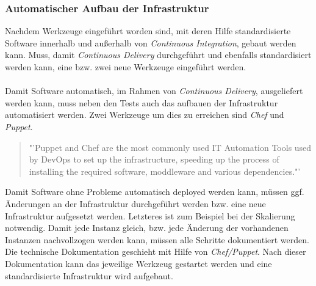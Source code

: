 \subsubsection*{Automatischer Aufbau der Infrastruktur}
Nachdem Werkzeuge eingeführt worden sind, mit deren Hilfe standardisierte Software innerhalb und außerhalb von \textit{Continuous Integration}, gebaut werden kann. Muss, damit \textit{Continuous Delivery} durchgeführt und ebenfalls standardisiert werden kann, eine bzw. zwei neue Werkzeuge eingeführt werden.
\\\\
Damit Software automatisch, im Rahmen von \textit{Continuous Delivery}, ausgeliefert werden kann, muss neben den Tests auch das aufbauen der Infrastruktur automatisiert werden. Zwei Werkzeuge um dies zu erreichen sind \textit{Chef} und \textit{Puppet}.
\begin{quote}
	"'Puppet and Chef are the most commonly used IT Automation Tools used by DevOps to set up the infrastructure, speeding up the process of installing the required software, moddleware and various dependencies."'\cite{IEEE:CDMitJenkins}
\end{quote}
Damit Software ohne Probleme automatisch deployed werden kann, müssen ggf. Änderungen an der Infrastruktur durchgeführt werden bzw. eine neue Infrastruktur aufgesetzt werden. Letzteres ist zum Beispiel bei der Skalierung notwendig. Damit jede Instanz gleich, bzw. jede Änderung der vorhandenen Instanzen nachvollzogen werden kann, müssen alle Schritte dokumentiert werden. Die technische Dokumentation geschieht mit Hilfe von \textit{Chef/Puppet}. Nach dieser Dokumentation kann das jeweilige Werkzeug gestartet werden und eine standardisierte Infrastruktur wird aufgebaut.

